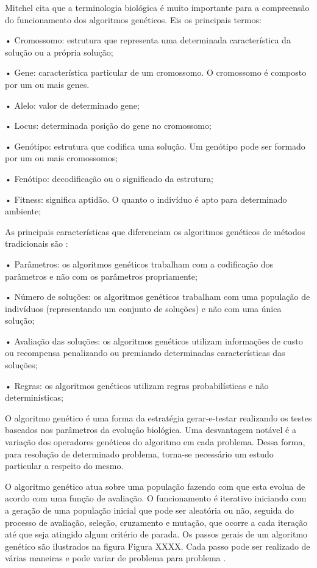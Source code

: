 Mitchel \cite{mitchell1998introduction} cita que a terminologia biológica é muito importante para a compreensão do funcionamento dos algoritmos genéticos. Eis os principais termos: \par
•  Cromossomo: estrutura que representa uma determinada característica da solução ou a própria solução; \par
•  Gene: característica particular de um cromossomo. O cromossomo é composto por um ou mais genes. \par
•  Alelo: valor de determinado gene;\par
•  Locus: determinada posição do gene no cromossomo;\par
•  Genótipo: estrutura que codifica uma solução. Um genótipo pode ser formado por um ou mais cromossomos; \par
•  Fenótipo: decodificação ou o significado da estrutura; \par
•  Fitness: significa aptidão. O quanto o indivíduo é apto para determinado ambiente; \par
As principais características que diferenciam os algoritmos genéticos de métodos tradicionais são \cite{goldberg1989genetic}: \par
•  Parâmetros: os algoritmos genéticos trabalham com a codificação dos parâmetros e não com os parâmetros propriamente; \par
•  Número de soluções: os algoritmos genéticos trabalham com uma população de indivíduos (representando um conjunto de soluções) e não com uma única solução; \par

•  Avaliação das soluções: os algoritmos genéticos utilizam informações de custo ou recompensa penalizando ou premiando determinadas características das soluções; \par

•  Regras: os algoritmos genéticos utilizam regras probabilísticas e não determinísticas; \par

O algoritmo genético é uma forma da estratégia gerar-e-testar realizando os testes baseados nos parâmetros da evolução biológica. Uma desvantagem notável é a variação dos operadores genéticos do algoritmo em cada problema. Dessa forma, para resolução de determinado problema, torna-se necessário um estudo particular a respeito do mesmo. \par

O algoritmo genético atua sobre uma população fazendo com que esta evolua de acordo com uma função de avaliação. O funcionamento é iterativo iniciando com a geração de uma população inicial que pode ser aleatória ou não, seguida do processo de avaliação, seleção, cruzamento e mutação, que ocorre a cada iteração até que seja atingido algum critério de parada. Os passos gerais de um algoritmo genético são ilustrados na figura 
Figura XXXX. Cada passo pode ser realizado de várias maneiras e pode variar de problema para problema \cite{timoteo2005desenvolvimento}.\par 

